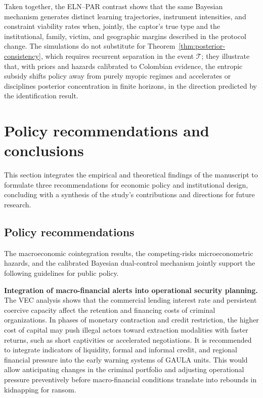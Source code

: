 \documentclass[ecta,nameyear,draft]{econsocart}
\theoremstyle{plain}
\theoremstyle{definition}
\newcommand{\1}{\mathbf{1}}
\begin{document}
Taken together, the ELN--PAR contrast shows that the same Bayesian mechanism generates distinct learning trajectories, instrument intensities, and constraint viability rates when, jointly, the captor's true type and the institutional, family, victim, and geographic margins described in the protocol change. The simulations do not substitute for Theorem~\ref{thm:posterior-consistency}, which requires recurrent separation in the event $\mathcal{T}$; they illustrate that, with priors and hazards calibrated to Colombian evidence, the entropic subsidy shifts policy away from purely myopic regimes and accelerates or disciplines posterior concentration in finite horizons, in the direction predicted by the identification result.

\section{Policy recommendations and conclusions}\label{sec:conclusiones}

This section integrates the empirical and theoretical findings of the manuscript to formulate three recommendations for economic policy and institutional design, concluding with a synthesis of the study's contributions and directions for future research.

\subsection{Policy recommendations}

The macroeconomic cointegration results, the competing-risks microeconometric hazards, and the calibrated Bayesian dual-control mechanism jointly support the following guidelines for public policy.

\textbf{Integration of macro-financial alerts into operational security planning.}\quad
The VEC analysis shows that the commercial lending interest rate and persistent coercive capacity affect the retention and financing costs of criminal organizations. In phases of monetary contraction and credit restriction, the higher cost of capital may push illegal actors toward extraction modalities with faster returns, such as short captivities or accelerated negotiations. It is recommended to integrate indicators of liquidity, formal and informal credit, and regional financial pressure into the early warning systems of GAULA units. This would allow anticipating changes in the criminal portfolio and adjusting operational pressure preventively before macro-financial conditions translate into rebounds in kidnapping for ransom.
\end{document}

